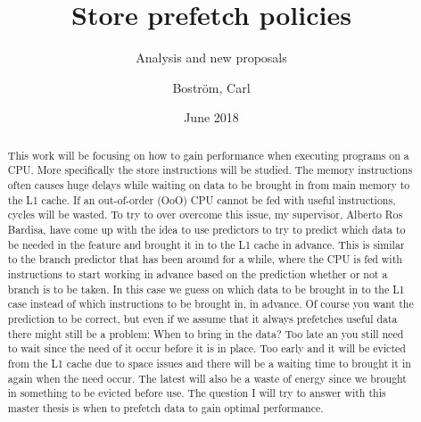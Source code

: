 \documentclass[a4paper,12pt]{article}
\title{Store prefetch policies}
\subtitle{Analysis and new proposals}
\author{Boström, Carl}
\date{June 2018}
\begin{document}
\maketitle
\frontmatter
\begin{abstract}
This work will be focusing on how to gain performance when executing programs on a CPU. More specifically the store instructions will be studied. The memory instructions often causes huge delays while waiting on data to be brought in from main memory to the L1 cache. If an out-of-order (OoO) CPU cannot be fed with useful instructions, cycles will be wasted. To try to over overcome this issue, my supervisor, Alberto Ros Bardisa, have come up with the idea to use predictors to try to predict which data to be needed in the feature and brought it in to the L1 cache in advance. This is similar to the branch predictor that has been around for a while, where the CPU is fed with instructions to start working in advance based on the prediction whether or not a branch is to be taken. In this case we guess on which data to be brought in to the L1 case instead of which instructions to be brought in, in advance. Of course you want the prediction to be correct, but even if we assume that it always prefetches useful data there might still be a problem: When to bring in the data? Too late an you still need to wait since the need of it occur before it is in place. Too early and it will be evicted from the L1 cache due to space issues and there will be a waiting time to brought it in again when the need occur. The latest will also be a waste of energy since we brought in something to be evicted before use. The question I will try to answer with this master thesis is when to prefetch data to gain optimal performance. 
\end{abstract}
\end{document}
